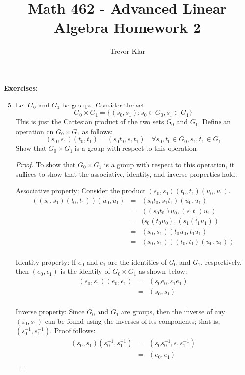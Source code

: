 \documentclass[letterpaper]{article}
\title{Math 462 - Advanced Linear Algebra \linebreak
	Homework 2}
\author{Trevor Klar}
\begin{document}
\maketitle

\noindent \textbf{Exercises:}
\begin{enumerate}
\setcounter{enumi}{4}
\item Let $G_0$ and $G_1$ be groups. Consider the set 
$$G_0\times G_1 = \{(s_0,s_1):s_0 \in G_0, s_1 \in G_1\}$$
This is just the Cartesian product of the two sets $G_0$ and $G_1$. Define an operation on $G_0\times G_1$ as follows:
$$(s_0,s_1)(t_0,t_1) = (s_0t_0,s_1t_1) \quad \forall s_0,t_0\in G_0, s_1,t_1 \in G_1$$
Show that $G_0\times G_1$ is a group with respect to this operation. 
\begin{proof}
To show that $G_0\times G_1$ is a group with respect to this operation, it suffices to show that the associative, identity, and inverse properties hold.

Associative property: Consider the product $(s_0,s_1)(t_0,t_1)(u_0,u_1)$. 
\[
\begin{array}{rcl}
((s_0,s_1)(t_0,t_1))(u_0,u_1) &=& (s_0t_0,s_1t_1)(u_0,u_1) \\
&=& ((s_0t_0)u_0,(s_1t_1)u_1)\\
&=& (s_0(t_0u_0),(s_1(t_1u_1))\\
&=& (s_0,s_1)(t_0u_0,t_1u_1)\\
&=& (s_0,s_1)((t_0,t_1)(u_0,u_1))\\
\end{array}
\]

Identity property: If $e_0$ and $e_1$ are the identities of $G_0$ and $G_1$, respectively, then $(e_0,e_1)$ is the identity of $G_0\times G_1$ as shown below:
\[
\begin{array}{rcl}
(s_0,s_1)(e_0,e_1) &=& (s_0e_0,s_1e_1)\\
&=& (s_0,s_1)\\
\end{array}
\]

Inverse property: Since $G_0$ and $G_1$ are groups, then the inverse of any $(s_0,s_1)$ can be found using the inverses of its components; that is, $(s_0^{-1},s_1^{-1})$. Proof follows:
\[
\begin{array}{rcl}
(s_0,s_1)(s_0^{-1},s_1^{-1}) &=& (s_0s_0^{-1},s_1s_1^{-1})\\
&=& (e_0,e_1)\\
\end{array}
\]
\end{proof}


\end{enumerate}
\end{document}
